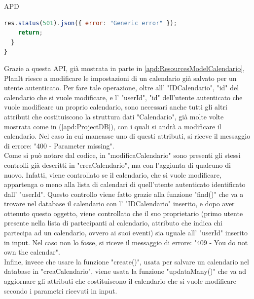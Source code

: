\begin{listaPersonale} {APD}
\begin{listaPersonale2}[APD]{}
\begin{lstlisting}[language=JavaScript]
    res.status(501).json({ error: "Generic error" });
    return;
  }
}
                    \end{lstlisting}
                \newpage
                Grazie a questa API, già mostrata in parte in \ref{apd:ResourcesModelCalendario}, PlanIt riesce a modificare le impostazioni di un calendario già salvato per un utente autenticato. Per fare tale operazione, oltre all' "IDCalendario", "id" del calendario che si vuole modificare, e l' "userId", "id" dell'utente autenticato che vuole modificare un proprio calendario, sono necessari anche tutti gli altri attributi che costituiscono la struttura dati "Calendario", già molte volte mostrata come in (\ref{apd:ProjectDB}), con i quali si andrà a modificare il calendario. Nel caso in cui mancasse uno di questi attributi, si riceve il messaggio di errore: "400 - Parameter missing". \\
                Come si può notare dal codice, in "modificaCalendario" sono presenti gli stessi controlli già descritti in "creaCalendario", ma con l'aggiunta di qualcuno di nuovo. Infatti, viene controllato se il calendario, che si vuole modificare, appartenga o meno alla lista di calendari di quell'utente autenticato identificato dall' "userId". Questo controllo viene fatto grazie alla funzione "find()" che va a trovare nel database il calendario con l' "IDCalendario" inserito, e dopo aver ottenuto questo oggetto, viene controllato che il suo proprietario (primo utente presente nella lista di partecipanti al calendario, attributo che indica chi partecipa ad un calendario, ovvero ai suoi eventi) sia uguale all' "userId" inserito in input. Nel caso non lo fosse, si riceve il messaggio di errore: "409 - You do not own the calendar". \\
                Infine, invece che usare la funzione "create()", usata per salvare un calendario nel database in "creaCalendario", viene usata la funzione "updataMany()" che va ad aggiornare gli attributi che costituiscono il calendario che si vuole modificare secondo i parametri ricevuti in input.

\end{listaPersonale2}
\end{listaPersonale}

